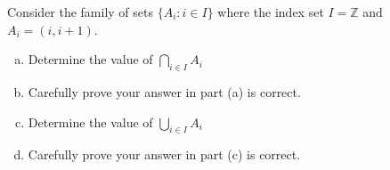 \documentclass[11pt]{exam}
\theoremstyle{definition}
\begin{document}
\begin{questions}
\newpage
\question[10]\mbox{}
Consider the family of sets $\{A_i: i\in I\}$ where the index set $I = \mathbb{Z}$ and $A_i = (i,i+1)$.
\begin{enumerate}[(a)]
\item Determine the value of $\bigcap_{i\in I} A_i$
\vspace{1in}
\item Carefully prove your answer in part (a) is correct.
\vspace{3in}
\item Determine the value of $\bigcup_{i\in I} A_i$
\vspace{1in}
\item Carefully prove your answer in part (c) is correct.
\end{enumerate}

\end{questions}
\end{document}
